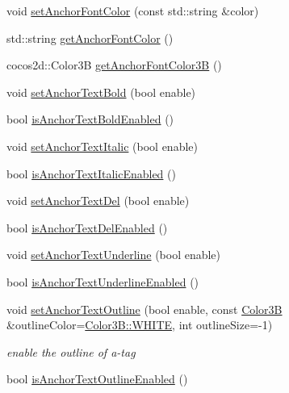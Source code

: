 \begin{DoxyCompactItemize}
\item 
void \hyperlink{classui_1_1RichText_ab5765e7b72e36140f923a34a3e891536}{set\+Anchor\+Font\+Color} (const std\+::string \&color)
\item 
std\+::string \hyperlink{classui_1_1RichText_a87568750c7b12cf8b2d542ea4d9b3271}{get\+Anchor\+Font\+Color} ()
\item 
cocos2d\+::\+Color3B \hyperlink{classui_1_1RichText_a6ebd0ca1c3d4d8efe02ab8278ee58467}{get\+Anchor\+Font\+Color3B} ()
\item 
void \hyperlink{classui_1_1RichText_af06a8855abd80bb3685bfa9d73649221}{set\+Anchor\+Text\+Bold} (bool enable)
\item 
bool \hyperlink{classui_1_1RichText_a9168dc9df12d1caa8752c30cedcfff3e}{is\+Anchor\+Text\+Bold\+Enabled} ()
\item 
void \hyperlink{classui_1_1RichText_ac453dba85e6b3ae984505377244e8cab}{set\+Anchor\+Text\+Italic} (bool enable)
\item 
bool \hyperlink{classui_1_1RichText_a25313840dc6addc935cabcff9e784302}{is\+Anchor\+Text\+Italic\+Enabled} ()
\item 
void \hyperlink{classui_1_1RichText_ac92f9783c67dbb7f294e917c7019d618}{set\+Anchor\+Text\+Del} (bool enable)
\item 
bool \hyperlink{classui_1_1RichText_ad0872f418f4d5e486328961254d6da45}{is\+Anchor\+Text\+Del\+Enabled} ()
\item 
void \hyperlink{classui_1_1RichText_a8e545c2ecb49337c34873e6335277714}{set\+Anchor\+Text\+Underline} (bool enable)
\item 
bool \hyperlink{classui_1_1RichText_ab133b87aace1a3d5e34cde0fb6183bde}{is\+Anchor\+Text\+Underline\+Enabled} ()
\item 
\mbox{\label{classui_1_1RichText_aa68c15b36eeba056f623a567ef532994}} 
void \hyperlink{classui_1_1RichText_aa68c15b36eeba056f623a567ef532994}{set\+Anchor\+Text\+Outline} (bool enable, const \hyperlink{structColor3B}{Color3B} \&outline\+Color=\hyperlink{structColor3B_adf57cb86ca15f434b29215ad471cdc35}{Color3\+B\+::\+W\+H\+I\+TE}, int outline\+Size=-\/1)
\begin{DoxyCompactList}\small\item\em enable the outline of a-\/tag \end{DoxyCompactList}\item 
bool \hyperlink{classui_1_1RichText_aac2385d3fb2dd635cecb25cb3a0110a2}{is\+Anchor\+Text\+Outline\+Enabled} ()
\item 

\end{DoxyCompactItemize}
